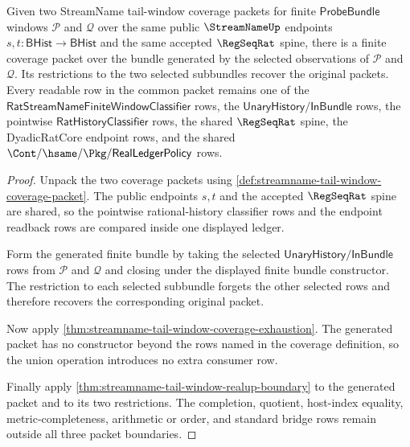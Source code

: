 \begin{theorem}
\label{thm:streamname-tail-window-cover-common-refinement}
Given two StreamName tail-window coverage packets for finite
$\mathsf{ProbeBundle}$ windows $\mathcal P$ and $\mathcal Q$ over the same
public $\StreamNameUp$ endpoints $s,t:\mathsf{BHist}\to\mathsf{BHist}$ and the
same accepted $\RegSeqRat$ spine, there is a finite coverage packet over the
bundle generated by the selected observations of $\mathcal P$ and $\mathcal Q$.
Its restrictions to the two selected subbundles recover the original packets.
Every readable row in the common packet remains one of the
$\mathsf{RatStreamNameFiniteWindowClassifier}$ rows, the
$\mathsf{UnaryHistory}/\mathsf{InBundle}$ rows, the pointwise
$\mathsf{RatHistoryClassifier}$ rows, the shared $\RegSeqRat$ spine, the
DyadicRatCore endpoint rows, and the shared
$\Cont/\hsame/\Pkg/\mathsf{RealLedgerPolicy}$ rows.
\end{theorem}
\begin{proof}
Unpack the two coverage packets using
\autoref{def:streamname-tail-window-coverage-packet}. The public endpoints
$s,t$ and the accepted $\RegSeqRat$ spine are shared, so the pointwise
rational-history classifier rows and the endpoint readback rows are compared
inside one displayed ledger.

Form the generated finite bundle by taking the selected
$\mathsf{UnaryHistory}/\mathsf{InBundle}$ rows from $\mathcal P$ and
$\mathcal Q$ and closing under the displayed finite bundle constructor. The
restriction to each selected subbundle forgets the other selected rows and
therefore recovers the corresponding original packet.

Now apply
\autoref{thm:streamname-tail-window-coverage-exhaustion}. The generated packet
has no constructor beyond the rows named in the coverage definition, so the
union operation introduces no extra consumer row.

Finally apply \autoref{thm:streamname-tail-window-realup-boundary} to the
generated packet and to its two restrictions. The completion, quotient,
host-index equality, metric-completeness, arithmetic or order, and standard
bridge rows remain outside all three packet boundaries.
\end{proof}


